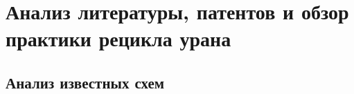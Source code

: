 \chapter{Анализ литературы, патентов и обзор практики рецикла урана}\label{ch:ch1}
   




\section{Анализ известных схем}\label{sec:ch1/sec2}
